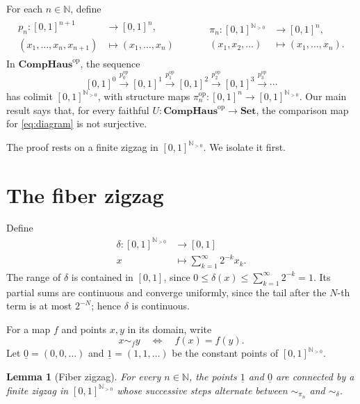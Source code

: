 \documentclass[11pt]{amsart}
\newcommand{\CompHaus}{\mathbf{CompHaus}}
\newcommand{\Set}{\mathbf{Set}}
\newcommand{\N}{\mathbb N}
\newcommand{\op}{\mathrm{op}}
\newtheorem{lemma}[theorem]{Lemma}
\theoremstyle{definition}
\theoremstyle{remark}
\begin{document}
For each \(n\in\N\), define
\begin{align*}
  \begin{aligned}
    p_n\colon [0,1]^{n+1}&\longrightarrow [0,1]^n,\\
    (x_1,\dots,x_n,x_{n+1})&\longmapsto (x_1,\dots,x_n)
  \end{aligned}
  &\qquad
  \begin{aligned}
    \pi_n\colon [0,1]^{\N_{>0}}&\longrightarrow [0,1]^n,\\
    (x_1,x_2,\dots)&\longmapsto (x_1,\dots,x_n).
  \end{aligned}
\end{align*}
In \(\CompHaus^{\op}\), the sequence
\begin{equation}\label{eq:diagram}
  [0,1]^0 \xrightarrow{p_0^{\op}} [0,1]^1\xrightarrow{p_1^{\op}}[0,1]^2
   \xrightarrow{p_2^{\op}}[0,1]^3
   \xrightarrow{p_3^{\op}}\cdots
\end{equation}
has colimit \([0,1]^{\N_{>0}}\), with structure maps
\(\pi_n^{\op}\colon [0,1]^n\to [0,1]^{\N_{>0}}\).  Our main result says that, for every faithful
\(U\colon\CompHaus^{\op}\to\Set\), the comparison map for
\eqref{eq:diagram} is not surjective.

The proof rests on a finite zigzag in \([0,1]^{\N_{>0}}\).  We isolate it first.

\section{The fiber zigzag}

Define
\begin{align*}
  \delta\colon [0,1]^{\N_{>0}}& \longrightarrow [0,1]\\
  x & \longmapsto \sum_{k=1}^{\infty}2^{-k}x_k .
\end{align*}
The range of \(\delta\) is contained in \([0,1]\), since
\(0\leq \delta(x)\leq\sum_{k=1}^{\infty}2^{-k}=1\).  Its partial sums are
continuous and converge uniformly, since the tail after the \(N\)-th term is
at most \(2^{-N}\); hence \(\delta\) is continuous.

For a map \(f\) and points \(x,y\) in its domain, write
\[
  x\sim_f y \quad\Longleftrightarrow\quad f(x)=f(y).
\]
Let \(\underline 0=(0,0,\ldots)\) and
\(\underline 1=(1,1,\ldots)\) be the constant points of \([0,1]^{\N_{>0}}\).

\begin{lemma}[Fiber zigzag]\label{lem:zigzag}
For every \(n\in\N\), the points \(\underline 1\) and \(\underline 0\)
are connected by a finite zigzag in \([0,1]^{\N_{>0}}\) whose successive steps alternate
between \(\sim_{\pi_n}\) and \(\sim_\delta\).
\end{lemma}
\end{document}
